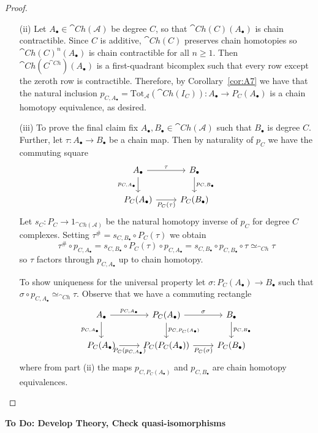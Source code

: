 \begin{proof}
\begin{itemize}
        \item[(ii)] Let $A_{\bullet} \in \cat{Ch}(\mathcal{A})$ be degree $C$, so that $\cat{Ch}(C)(A_\bullet)$ is chain contractible. Since $C$ is additive, $\cat{Ch}(C)$ preserves chain homotopies so $\cat{Ch}(C)^n(A_\bullet)$ is chain contractible for all $n \geq 1$. Then $\cat{Ch}(C^{\cat{Ch}})(A_\bullet)$ is a first-quadrant bicomplex such that every row except the zeroth row is contractible. Therefore, by Corollary~\ref{cor:A7} we have that the natural inclusion $p_{C,A_\bullet} = \text{Tot}_\mathcal{A}(\cat{Ch}(I_C)):A_\bullet \to P_C(A_\bullet)$ is a chain homotopy equivalence, as desired.
        \item[(iii)] To prove the final claim fix $A_\bullet,B_\bullet \in \cat{Ch}(\mathcal{A})$ such that $B_\bullet$ is degree $C$. Further, let $\tau:A_\bullet\to B_\bullet$ be a chain map. Then by naturality of $p_C$ we have the commuting square
        \[\begin{tikzcd}
            {A_\bullet} & {B_\bullet} \\
            {P_C(A_\bullet)} & {P_C(B_\bullet)}
            \arrow["\tau", from=1-1, to=1-2]
            \arrow["{p_{C,B_\bullet}}", from=1-2, to=2-2]
            \arrow["{p_{C,A_\bullet}}"', from=1-1, to=2-1]
            \arrow["{P_C(\tau)}"', from=2-1, to=2-2]
        \end{tikzcd}\]
        Let $s_C:P_C\to 1_{\cat{Ch}(\mathcal{A})}$ be the natural homotopy inverse of $p_C$ for degree $C$ complexes. Setting $\tau^\# = s_{C,B_\bullet}\circ P_C(\tau)$ we obtain
        \begin{equation*}
            \tau^\#\circ p_{C,A_\bullet} = s_{C,B_\bullet}\circ P_C(\tau)\circ p_{C,A_\bullet} = s_{C,B_\bullet}\circ p_{C,B_\bullet}\circ \tau \simeq_{\cat{Ch}}\tau
        \end{equation*}
        so $\tau$ factors through $p_{C,A_\bullet}$ up to chain homotopy. 

        \vspace{10pt}

        To show uniqueness for the universal property let $\sigma:P_C(A_\bullet)\to B_\bullet$ such that $\sigma\circ p_{C,A_\bullet} \simeq_{\cat{Ch}}\tau$. Observe that we have a commuting rectangle
        \[\begin{tikzcd}
            {A_\bullet} & {P_C(A_\bullet)} & {B_\bullet} \\
            {P_C(A_\bullet)} & {P_C(P_C(A_\bullet))} & {P_C(B_\bullet)}
            \arrow["{p_{C,A_\bullet}}"', from=1-1, to=2-1]
            \arrow["{P_C(p_{C,A_\bullet})}"', from=2-1, to=2-2]
            \arrow["{p_{C,A_\bullet}}", from=1-1, to=1-2]
            \arrow["{p_{C,P_C(A_\bullet)}}", from=1-2, to=2-2]
            \arrow["\sigma", from=1-2, to=1-3]
            \arrow["{p_{C,B_\bullet}}", from=1-3, to=2-3]
            \arrow["{P_C(\sigma)}"', from=2-2, to=2-3]
        \end{tikzcd}\]
        where from part (ii) the maps $p_{C,P_C(A_\bullet)}$ and $p_{C,B_\bullet}$ are chain homotopy equivalences. 
    \end{itemize}
\end{proof}

\textbf{To Do: Develop Theory, Check quasi-isomorphisms}
